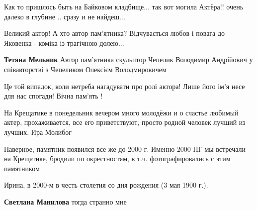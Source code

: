 \begin{itemize}
Как то пришлось быть на Байковом кладбище... так вот могила Актёра!! очень
далеко в глубине .. сразу и не найдеш...

Великий актор!
А хто автор пам'ятника? Відчувається любов і повага до Яковенка - коміка із трагічною долею...

\textbf{Тетяна Мельник} Автор пам'ятника скульптор Чепелик Володимир Андрійович у співавторстві з Чепеликом Олексієм Володмировичем


Це той випадок, коли нетреба нагадувати про ролі актора! Лише його ім'я несе
для нас спогади! Вічна пам'ять !


На Крещатике в понедельник вечером много молодёжи и о счастье любимый актер,
прохаживается, все его приветствуют, просто родной человек лучший из лучших.
Ира Молибог


Наверное, памятник появился все же до 2000 г. Именно 2000 НГ мы встречали на
Крещатике, бродили по окрестностям, в т.ч. фотографировались с этим памятником

\begin{itemize} %
Ирина, в 2000-м в честь столетия со дня рождения (3 мая 1900 г.).

\textbf{Светлана Манилова} тогда странно мне
\end{itemize} %

\end{itemize} %
